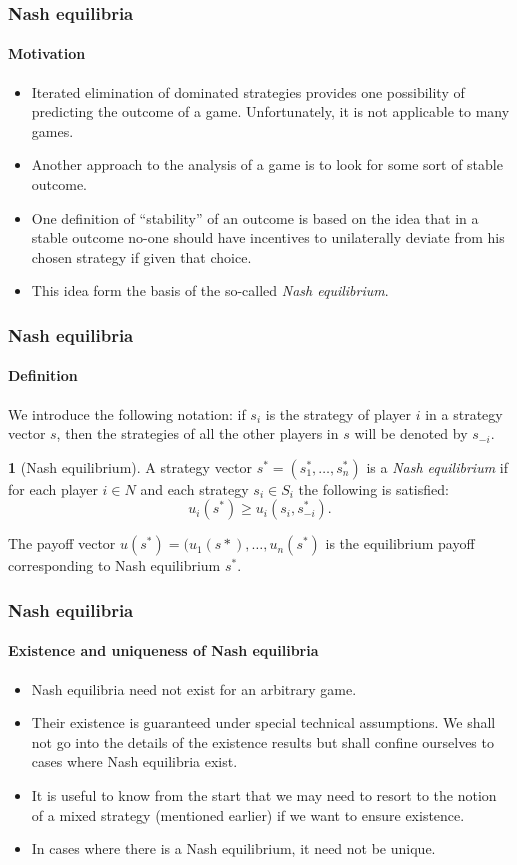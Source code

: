 \documentclass[10pt]{beamer}
\theoremstyle{definition}
\newtheorem{definition}{\translate{Definition}}
\begin{document}
\begin{frame}[fragile]
\frametitle{Nash equilibria}
\framesubtitle{Motivation}
\begin{itemize}\itemsep1em
\item Iterated elimination of dominated strategies provides one possibility of predicting the outcome of a game. Unfortunately, it is not applicable to many games.
\item Another approach to the analysis of a game is to look for some sort of stable outcome.
\item One definition of ``stability'' of an outcome is based on the idea that in a stable outcome no-one should have incentives to unilaterally deviate from his chosen strategy if given that choice.
\item This idea form the basis of the so-called \emph{Nash equilibrium}.
\end{itemize}
\end{frame}



\begin{frame}[fragile]
\frametitle{Nash equilibria}
\framesubtitle{Definition}
We introduce the following notation: if $ s_i $ is the strategy of player $ i $ in a strategy vector $ s $, then the strategies of all the other players in $ s $ will be denoted by $ s_{-i} $.\bigskip

\begin{definition}[Nash equilibrium]\label{def:NashEq}
A strategy vector $ s^* = (s_1^*,\ldots,s_n^*) $ is a \emph{Nash equilibrium} if for each player $ i \in N $ and each strategy $ s_i \in S_i $ the following is satisfied:
\begin{equation}
u_i(s^*)\geq u_i(s_i,s^*_{-i}).
\label{eq:NE}
\end{equation}

The payoff vector $ u(s^*) = (u_1(s*),\ldots,u_n(s^*) $ is the equilibrium payoff corresponding to Nash equilibrium $ s^* $.
\end{definition}
\end{frame}



\begin{frame}[fragile]
\frametitle{Nash equilibria}
\framesubtitle{Existence and uniqueness of Nash equilibria}
\begin{itemize}\itemsep1em
\item Nash equilibria need not exist for an arbitrary game.
\item Their existence is guaranteed under special technical assumptions. We shall not go into the details of the existence results but shall confine ourselves to cases where Nash equilibria exist.
\item It is useful to know from the start that we may need to resort to the notion of a mixed strategy (mentioned earlier) if we want to ensure existence.
\item In cases where there is a Nash equilibrium, it need not be unique.
\end{itemize}
\end{frame}
\end{document}
